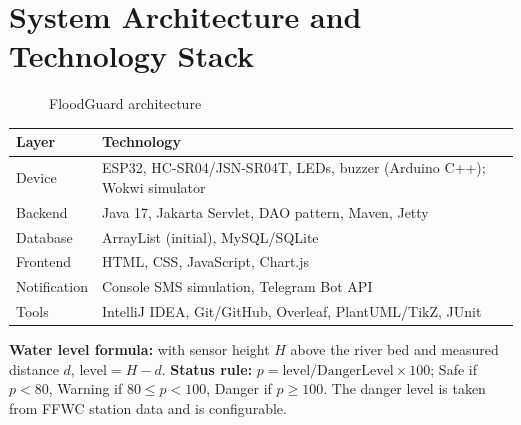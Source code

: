 \documentclass[12pt,a4paper]{article}
\begin{document}
\section{System Architecture and Technology Stack}
\begin{figure}[H]\centering
{}
\caption{FloodGuard architecture}
\end{figure}
\begin{table}[H]\centering\small
\begin{tabular}{@{}ll@{}}\toprule \textbf{Layer} & \textbf{Technology}\\\midrule
Device & ESP32, HC-SR04/JSN-SR04T, LEDs, buzzer (Arduino C++); Wokwi simulator\\
Backend & Java 17, Jakarta Servlet, DAO pattern, Maven, Jetty\\
Database & ArrayList (initial), MySQL/SQLite\\
Frontend & HTML, CSS, JavaScript, Chart.js\\
Notification & Console SMS simulation, Telegram Bot API\\
Tools & IntelliJ IDEA, Git/GitHub, Overleaf, PlantUML/TikZ, JUnit\\\bottomrule
\end{tabular}\end{table}
\noindent\textbf{Water level formula:} with sensor height $H$ above the river bed and measured distance $d$, $\text{level}=H-d$. \textbf{Status rule:} $p=\text{level}/\text{DangerLevel}\times100$; Safe if $p<80$, Warning if $80\le p<100$, Danger if $p\ge100$. The danger level is taken from FFWC station data and is configurable.
\end{document}
